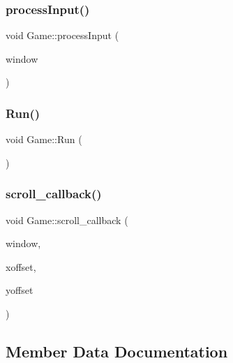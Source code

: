 \mbox{\label{classGame_a600b6bf8efd1874f5b5bdb8fdc48e549}} 
\subsubsection{\texorpdfstring{process\+Input()}{processInput()}}
{\footnotesize\ttfamily void Game\+::process\+Input (\begin{DoxyParamCaption}\item[{G\+L\+F\+Wwindow $\ast$}]{window }\end{DoxyParamCaption})}

\mbox{\label{classGame_a96341ca5b54d90adc3ecb3bf0bcd2312}} 
\subsubsection{\texorpdfstring{Run()}{Run()}}
{\footnotesize\ttfamily void Game\+::\+Run (\begin{DoxyParamCaption}{ }\end{DoxyParamCaption})}

\mbox{\label{classGame_ac3931568d19483386124d89aa0e2a762}} 
\subsubsection{\texorpdfstring{scroll\+\_\+callback()}{scroll\_callback()}}
{\footnotesize\ttfamily void Game\+::scroll\+\_\+callback (\begin{DoxyParamCaption}\item[{G\+L\+F\+Wwindow $\ast$}]{window,  }\item[{double}]{xoffset,  }\item[{double}]{yoffset }\end{DoxyParamCaption})}



\subsection{Member Data Documentation}
\mbox{\label{classGame_a8b54ceb7347e41f1e152c23bc91b618b}} 
